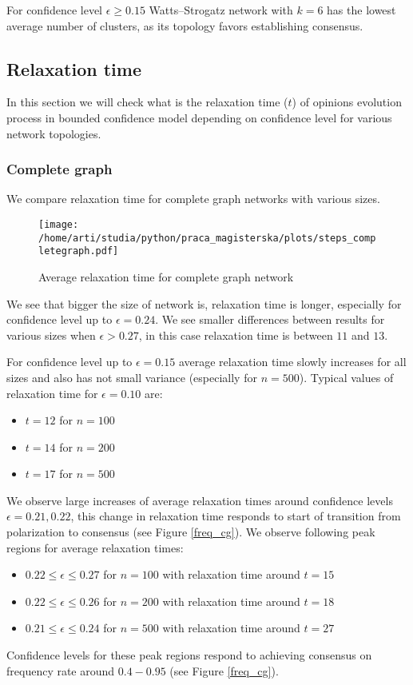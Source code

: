 \documentclass{article}
\begin{document}
For confidence level $\epsilon \geq 0.15$ Watts--Strogatz network with $k=6$ has the lowest average number of clusters, as its topology favors establishing consensus.

\subsection{Relaxation time}

In this section we will check what is the relaxation time ($t$) of opinions evolution process in bounded confidence model depending on confidence level for various network topologies.

\subsubsection{Complete graph}

We compare relaxation time for complete graph networks with various sizes.

\begin{figure}[H]
		\centering
		\texttt{[image: /home/arti/studia/python/praca\_magisterska/plots/steps\_completegraph.pdf]}
		\caption{Average relaxation time for complete graph network}
\end{figure}

We see that bigger the size of network is, relaxation time is longer, especially for confidence level up to $\epsilon=0.24$. We see smaller differences between results for various sizes when $\epsilon > 0.27$, in this case relaxation time is between $11$ and $13$. 
\indent

For confidence level up to $\epsilon=0.15$ average relaxation time slowly increases for all sizes and also has not small variance (especially for $n=500$). Typical values of relaxation time for $\epsilon=0.10$ are:
\begin{itemize}
\item $t=12$ for $n=100$
\item $t=14$ for $n=200$
\item $t=17$ for $n=500$
\end{itemize}
We observe large increases of average relaxation times around confidence levels $\epsilon=0.21, 0.22$, this change in relaxation time responds to start of transition from polarization to consensus (see Figure \ref{freq_cg}). We observe following peak regions for average relaxation times:
\begin{itemize}
\item $0.22 \leq \epsilon \leq 0.27$ for $n=100$ with relaxation time around $t=15$
\item $0.22 \leq \epsilon \leq 0.26$ for $n=200$ with relaxation time around $t=18$
\item $0.21 \leq \epsilon \leq 0.24$ for $n=500$ with relaxation time around $t=27$
\end{itemize}
Confidence levels for these peak regions respond to achieving consensus on frequency rate around $0.4-0.95$ (see Figure \ref{freq_cg}).
\end{document}
